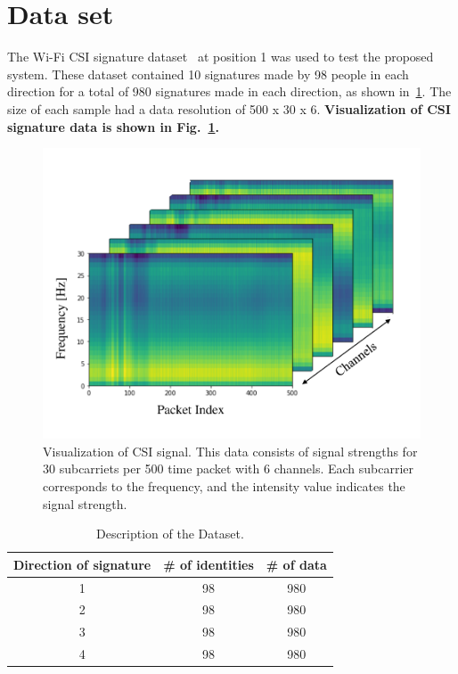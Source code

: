 \label{chp:Experiments}
\section{Data set}
\label{sec:Dataset}
The Wi-Fi CSI signature dataset~\cite{moon2017air} at position 1 was used to test the proposed system. These dataset contained 10 signatures made by 98 people in each direction for a total of 980 signatures made in each direction, as shown in~\ref{tab_dataset}. The size of each sample had a data resolution of 500 x 30 x 6. 
\textbf{
Visualization of CSI signature data is shown in Fig.~\ref{fig_csi}.}
\begin{figure}[!ht]
    \includegraphics[width=\textwidth]{fig_csi_v2.pdf}
    \caption{Visualization of CSI signal. This data consists of signal strengths for 30 subcarriets per 500 time packet with 6 channels. Each subcarrier corresponds to the frequency, and the intensity value indicates the signal strength.} \label{fig_csi}
\end{figure}
\begin{table}
    \caption{Description of the Dataset.}
    \label{tab_dataset}
    \begin{tabular}{ccc}
    \hline
    Direction of signature & \# of identities & \# of data \\ 
    \hline
    1                      & 98               & 980        \\ 
    2                      & 98               & 980        \\ 
    3                      & 98               & 980        \\ 
    4                      & 98               & 980        \\ 
    \hline
    \end{tabular}
\end{table}

